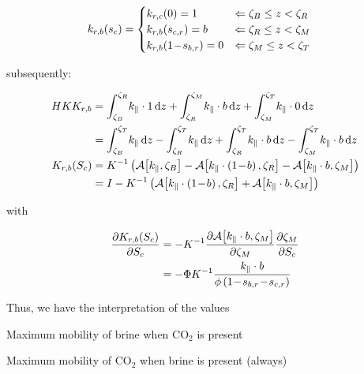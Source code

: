 \documentclass[12pt]{scrartcl}
\newcommand{\mth}[1]{\ensuremath{#1}\xspace}
\newcommand{\wid}[1]{\widthof{\bfseries {#1} \hspace{\labelsep}}}
\newcommand{\COO}{\mth{\mathrm{CO}_2}}
\newcommand{\aleft}{\mathopen{}\mathclose\bgroup\left}  %
\newcommand{\aright}{\aftergroup\egroup\right}          %
\newcommand{\binop}[3]{#1\mkern1mu{#2}\mkern1mu #3}     %
\newcommand{\dual}[1]{\binop{1}{-}{#1}}                 %
\newcommand{\ddual}[2]{\binop{\binop{1}{-}{#1}}{-}{#2}} %
\newcommand{\der}[2]{\frac{\partial{#1}}{\partial{#2}}}       %
\newcommand{\intg}[4]{\int_{#1}^{#2}\!{#3}\,\mathrm{d}{#4}}   %
\newcommand{\inv}[1]{{#1}^{-1}}                               %
\newcommand{\latr}[1]{{#1}_{\|}}                              %
\newcommand{\Hei}{H}        %
\newcommand{\Por}{\Phi}     %
\newcommand{\por}{\phi}     %
\newcommand{\Sat}{S}        %
\newcommand{\sat}{s}        %
\newcommand{\sr}[1]{\sat_{#1,r}}    %
\newcommand{\Prm}{K}        %
\newcommand{\prm}{k}        %
\newcommand{\Rlp}[1]{K_{r,#1}}  %
\newcommand{\rlp}[1]{k_{r,#1}}  %
\newcommand{\Lev}{\zeta}    %
\newcommand{\Top}{T}        %
\newcommand{\Bot}{B}        %
\newcommand{\Res}{R}        %
\newcommand{\Mob}{M}        %
\newcommand{\dph}{z}        %
\newcommand{\nap}{c}        %
\newcommand{\wet}{b}        %
\newcommand{\avg}[2]{\mathcal{A}\aleft[#1, #2\aright]}  %
\newcommand{\krnwr}{c}      %
\newcommand{\krwnr}{b}      %
\newcommand{\Satn}{\Sat_\nap}
\newcommand{\satn}{\sat_\nap}
\newcommand{\snr}{\sr{\nap}}    %
\newcommand{\swr}{\sr{\wet}}    %
\newcommand{\LevT}{\Lev_\Top}
\newcommand{\LevB}{\Lev_\Bot}
\newcommand{\LevM}{\Lev_\Mob}
\newcommand{\LevR}{\Lev_\Res}
\newcommand{\rlpn}{\rlp{\nap}}
\newcommand{\Rlpw}{\Rlp{\wet}}  %
\newcommand{\rlpw}{\rlp{\wet}}
\newcommand{\Absprm}{\Prm}          %
\newcommand{\absprm}{\latr{\prm}}   %
\begin{document}
\begin{align}
\rlpw \aleft( \satn \aright) &=
\begin{cases}
\rlpn \aleft( 0 \aright) = 1 & \Leftarrow \LevB \leq \dph < \LevR \\
\rlpw \aleft( \snr \aright) = \krwnr & \Leftarrow \LevR \leq \dph < \LevM \\
\rlpw \aleft( \dual{ \swr } \aright) = 0 & \Leftarrow \LevM \leq \dph < \LevT
\end{cases}
\end{align}

subsequently:

\begin{align}
\Hei \Absprm \Rlpw &= \intg{ \LevB }{ \LevR }{ \absprm \cdot 1 }{ \dph } + \intg{ \LevR }{ \LevM }{ \absprm \cdot \krwnr }{ \dph } + \intg{ \LevM }{ \LevT }{ \absprm \cdot 0 }{ \dph } \\
&= \intg{ \LevB }{ \LevT }{ \absprm }{ \dph } - \intg{ \LevR }{ \LevT }{ \absprm }{ \dph } + \intg{ \LevR }{ \LevT }{ \absprm \cdot \krwnr }{ \dph } - \intg{ \LevM }{ \LevT }{ \absprm \cdot \krwnr }{ \dph } \\
\Rlpw \aleft( \Satn \aright) &= \inv{ \Absprm } \left( \avg{ \absprm }{ \LevB } - \avg{ \absprm \cdot \left( \dual{ \krwnr } \right) }{ \LevR } - \avg{ \absprm \cdot \krwnr }{ \LevM } \right) \\
&= I - \inv{ \Absprm } \left( \avg{ \absprm \cdot \left( \dual{ \krwnr } \right) }{ \LevR } + \avg{ \absprm \cdot \krwnr }{ \LevM } \right)
\end{align}

with

\begin{align}
\der{ \Rlpw \aleft( \Satn \aright) }{ \Satn } &= - \inv{ \Absprm } \der{ \avg{ \absprm \cdot \krwnr }{ \LevM } }{ \LevM } \der{ \LevM }{ \Satn } \\
&= - \Por \inv{ \Absprm } \frac{ \absprm \cdot \krwnr }{ \por \left( \ddual{ \swr }{ \snr } \right) }
\end{align}

Thus, we have the interpretation of the values

\begin{description}[labelwidth=\wid{\( \krnwr \)}]
\item[ \( \krwnr \) ] Maximum mobility of brine when \COO is present
\item[ \( \krnwr \) ] Maximum mobility of \COO when brine is present (always)
\end{description}
\end{document}
